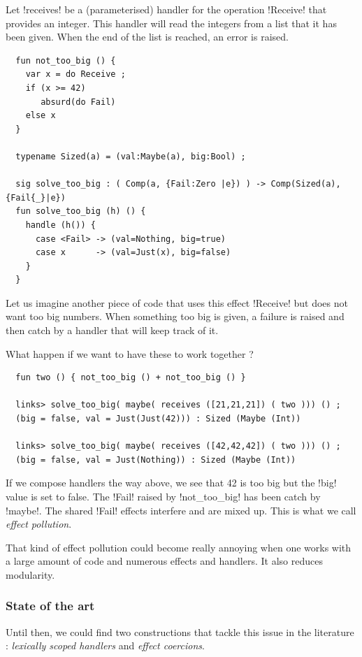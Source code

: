 \documentclass[11pt, nonacm=true, language=french, language=english]{acmart}
\begin{document}
Let !receives! be a (parameterised) handler for the operation !Receive! that provides an integer. This handler will read the integers from a list that it has been given. When the end of the list is reached, an error is raised.

\begin{lstlisting}
  fun not_too_big () {
    var x = do Receive ;
    if (x >= 42)
       absurd(do Fail)
    else x
  }

  typename Sized(a) = (val:Maybe(a), big:Bool) ;

  sig solve_too_big : ( Comp(a, {Fail:Zero |e}) ) -> Comp(Sized(a), {Fail{_}|e})
  fun solve_too_big (h) () {
    handle (h()) {
      case <Fail> -> (val=Nothing, big=true)
      case x      -> (val=Just(x), big=false)
    }
  }
\end{lstlisting}

Let us imagine another piece of code that uses this effect !Receive! but does not want too big numbers. When something too big is given, a failure is raised and then catch by a handler that will keep track of it.

What happen if we want to have these to work together ?

\begin{lstlisting}
  fun two () { not_too_big () + not_too_big () }

  links> solve_too_big( maybe( receives ([21,21,21]) ( two ))) () ;
  (big = false, val = Just(Just(42))) : Sized (Maybe (Int))

  links> solve_too_big( maybe( receives ([42,42,42]) ( two ))) () ;
  (big = false, val = Just(Nothing)) : Sized (Maybe (Int))
\end{lstlisting}

If we compose handlers the way above, we see that 42 is too big but the !big! value is set to false. The !Fail! raised by !not_too_big! has been catch by !maybe!. The shared !Fail! effects interfere and are mixed up. This is what we call \emph{effect pollution}.

That kind of effect pollution could become really annoying when one works with a large amount of code and numerous effects and handlers. It also reduces modularity.

\subsubsection{State of the art}
\label{sec:state-art}

Until then, we could find two constructions that tackle this issue in the literature : \emph{lexically scoped handlers} and \emph{effect coercions}.
\end{document}
